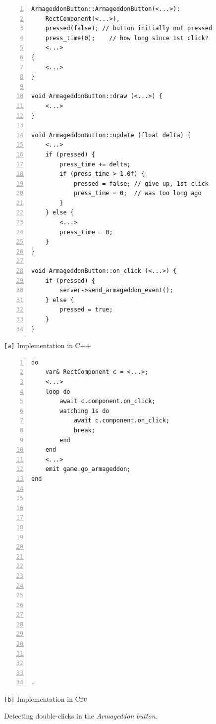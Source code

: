 \documentclass{vgtc}                          %
\newcommand{\CEU}{\textsc{C\'{e}u}\xspace}
\newcommand{\code}[1] {{\small{\texttt{#1}}}}
\newcommand{\ax}{\code{[a]}\xspace}
\newcommand{\bx}{\code{[b]}\xspace}
\begin{document}
\begin{figure}[t]
\begin{minipage}[t]{0.55\linewidth}
\begin{lstlisting}[numbers=left,xleftmargin=3em]
ArmageddonButton::ArmageddonButton(<...>):
    RectComponent(<...>),
    pressed(false); // button initially not pressed
    press_time(0);    // how long since 1st click?
    <...>
{
    <...>
}

void ArmageddonButton::draw (<...>) {
    <...>
}

void ArmageddonButton::update (float delta) {
    <...>
    if (pressed) {
        press_time += delta;
        if (press_time > 1.0f) {
            pressed = false; // give up, 1st click
            press_time = 0;  // was too long ago
        }
    } else {
        <...>
        press_time = 0;
    }
}

void ArmageddonButton::on_click (<...>) {
    if (pressed) {
        server->send_armageddon_event();
    } else {
        pressed = true;
    }
}
\end{lstlisting}
\centering\small{\ax Implementation in C++}
\end{minipage}
%
\begin{minipage}[t]{0.45\linewidth}
\begin{lstlisting}[numbers=left,xleftmargin=3em]
do
    var& RectComponent c = <...>;
    <...>
    loop do
        await c.component.on_click;
        watching 1s do
            await c.component.on_click;
            break;
        end
    end
    <...>
    emit game.go_armageddon;
end




















.
\end{lstlisting}
\centering\small{\bx Implementation in \CEU}
\end{minipage}
\caption{ Detecting double-clicks in the \emph{Armageddon button}.
\label{lst.armageddon}
}
\end{figure}
\end{document}
